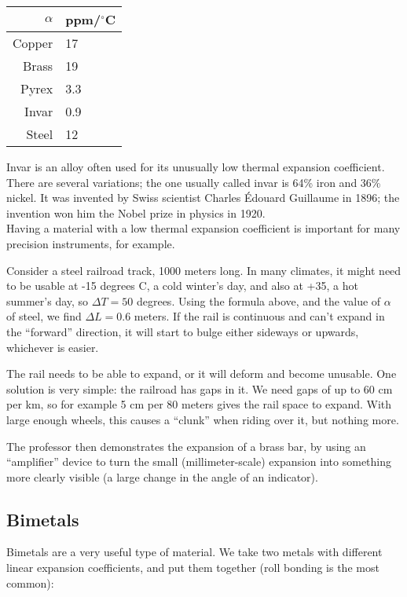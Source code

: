 \begin{center}
\begin{tabular}{|r|l|}
\hline
$\alpha$ & ppm/${}^\circ$C\\ \hline
Copper & 17\\\
Brass & 19\\
Pyrex & 3.3\\
Invar & 0.9\\
Steel & 12\\
\hline
\end{tabular}
\end{center}

Invar is an alloy often used for its unusually low thermal expansion coefficient. There are several variations; the one usually called invar is 64\% iron and 36\% nickel. It was invented by Swiss scientist Charles \'{E}douard Guillaume in 1896; the invention won him the Nobel prize in physics in 1920.\\
Having a material with a low thermal expansion coefficient is important for many precision instruments, for example.

Consider a steel railroad track, 1000 meters long. In many climates, it might need to be usable at -15 degrees C, a cold winter's day, and also at +35, a hot summer's day, so $\Delta T = 50$ degrees. Using the formula above, and the value of $\alpha$ of steel, we find $\Delta L = 0.6$ meters. If the rail is continuous and can't expand in the ``forward'' direction, it will start to bulge either sideways or upwards, whichever is easier.

The rail needs to be able to expand, or it will deform and become unusable. One solution is very simple: the railroad has gaps in it. We need gaps of up to 60 cm per km, so for example 5 cm per 80 meters gives the rail space to expand. With large enough wheels, this causes a ``clunk'' when riding over it, but nothing more.

The professor then demonstrates the expansion of a brass bar, by using an ``amplifier'' device to turn the small (millimeter-scale) expansion into something more clearly visible (a large change in the angle of an indicator).

\subsection{Bimetals}

Bimetals are a very useful type of material. We take two metals with different linear expansion coefficients, and put them together (roll bonding is the most common):

